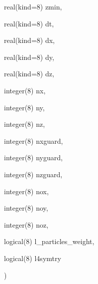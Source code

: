 {\begin{DoxyParamCaption}
\item[{real(kind=8)}]{zmin, }
\item[{real(kind=8)}]{dt, }
\item[{real(kind=8)}]{dx, }
\item[{real(kind=8)}]{dy, }
\item[{real(kind=8)}]{dz, }
\item[{integer(8)}]{nx, }
\item[{integer(8)}]{ny, }
\item[{integer(8)}]{nz, }
\item[{integer(8)}]{nxguard, }
\item[{integer(8)}]{nyguard, }
\item[{integer(8)}]{nzguard, }
\item[{integer(8)}]{nox, }
\item[{integer(8)}]{noy, }
\item[{integer(8)}]{noz, }
\item[{logical(8)}]{l\+\_\+particles\+\_\+weight, }
\item[{logical(8)}]{l4symtry}
\end{DoxyParamCaption}
)}\hypertarget{current__deposition_8_f90_ab2df44ab280a4669e4432d4538e70c79}{}\label{current__deposition_8_f90_ab2df44ab280a4669e4432d4538e70c79}
